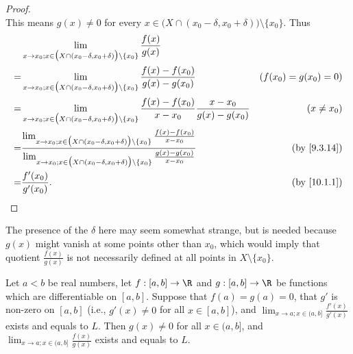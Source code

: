 \begin{proof}
\[  \]
  This means \(g(x) \neq 0\) for every \(x \in \big(X \cap (x_0 - \delta, x_0 + \delta)\big) \setminus \{x_0\}\).
  Thus
  \begin{align*}
      & \lim_{x \to x_0 ; x \in \big(X \cap (x_0 - \delta, x_0 + \delta)\big) \setminus \{x_0\}} \frac{f(x)}{g(x)}                                                                                                                                                                        \\
    = & \lim_{x \to x_0 ; x \in \big(X \cap (x_0 - \delta, x_0 + \delta)\big) \setminus \{x_0\}} \frac{f(x) - f(x_0)}{g(x) - g(x_0)}                                                                                                                          & (f(x_0) = g(x_0) = 0)     \\
    = & \lim_{x \to x_0 ; x \in \big(X \cap (x_0 - \delta, x_0 + \delta)\big) \setminus \{x_0\}} \frac{f(x) - f(x_0)}{x - x_0} \frac{x - x_0}{g(x) - g(x_0)}                                                                                                  & (x \neq x_0)              \\
    = & \frac{\lim_{x \to x_0 ; x \in \big(X \cap (x_0 - \delta, x_0 + \delta)\big) \setminus \{x_0\}} \frac{f(x) - f(x_0)}{x - x_0}}{\lim_{x \to x_0 ; x \in \big(X \cap (x_0 - \delta, x_0 + \delta)\big) \setminus \{x_0\}} \frac{g(x) - g(x_0)}{x - x_0}} & \text{(by \cref{9.3.14})} \\
    = & \frac{f'(x_0)}{g'(x_0)}.                                                                                                                                                                                                                              & \text{(by \cref{10.1.1})}
  \end{align*}
\end{proof}

\begin{note}
  The presence of the \(\delta\) here may seem somewhat strange, but is needed because \(g(x)\) might vanish at some points other than \(x_0\), which would imply that quotient \(\frac{f(x)}{g(x)}\) is not necessarily defined at all points in \(X \setminus \{x_0\}\).
\end{note}

\begin{prop}\label{10.5.2}
  Let \(a < b\) be real numbers, let \(f : [a, b] \to \R\) and \(g : [a, b] \to \R\) be functions which are differentiable on \([a, b]\).
  Suppose that \(f(a) = g(a) = 0\), that \(g'\) is non-zero on \([a, b]\) (i.e., \(g'(x) \neq 0\) for all \(x \in [a, b]\)), and \(\lim_{x \to a ; x \in (a, b]} \frac{f'(x)}{g'(x)}\) exists and equals to \(L\).
  Then \(g(x) \neq 0\) for all \(x \in (a, b]\), and \(\lim_{x \to a ; x \in (a, b]} \frac{f(x)}{g(x)}\) exists and equals to \(L\).
\end{prop}

